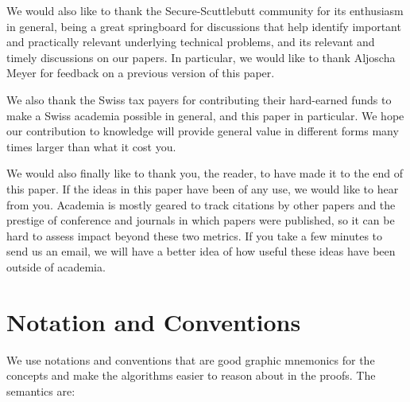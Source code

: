 \documentclass[9pt, oneside]{article}   	%
\begin{document}
We would also like to thank the Secure-Scuttlebutt community for its enthusiasm in general, being a great springboard for discussions that help identify important and practically relevant underlying technical problems, and its relevant and timely discussions on our papers. In particular, we would like to thank Aljoscha Meyer for feedback on a previous version of this paper.

We also thank the Swiss tax payers for contributing their hard-earned funds to make a Swiss academia possible in general, and this paper in particular. We hope our contribution to knowledge will provide general value in different forms many times larger than what it cost you.

We would also finally like to thank you, the reader, to have made it to the end of this paper. If the ideas in this paper have been of any use, we would like to hear from you. Academia is mostly geared to track citations by other papers and the prestige of conference and journals in which papers were published, so it can be hard to assess impact beyond these two metrics. If you take a few minutes to send us an email, we will have a better idea of how useful these ideas have been outside of academia.

\newpage




\appendix

\newpage
\section{Notation and Conventions}
\label{apdx:notation}

We use notations and conventions that are good graphic mnemonics for the concepts and make the algorithms easier to reason about in the proofs. The semantics are:
\end{document}
